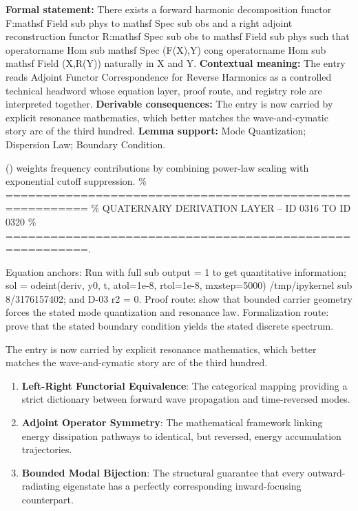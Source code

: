 \begingroup\footnotesize\setlength{\emergencystretch}{3em}\sloppy
\textbf{Formal statement:} There exists a forward harmonic decomposition functor F:mathsf Field sub phys to mathsf Spec sub obs and a right adjoint reconstruction functor R:mathsf Spec sub obs to mathsf Field sub phys such that operatorname Hom sub mathsf Spec (F(X),Y) cong operatorname Hom sub mathsf Field (X,R(Y)) naturally in X and Y. \textbf{Contextual meaning:} The entry reads Adjoint Functor Correspondence for Reverse Harmonics as a controlled technical headword whose equation layer, proof route, and registry role are interpreted together. \textbf{Derivable consequences:} The entry is now carried by explicit resonance mathematics, which better matches the wave-and-cymatic story arc of the third hundred. \textbf{Lemma support:} Mode Quantization; Dispersion Law; Boundary Condition.\par
\endgroup

() weights frequency contributions by combining power-law scaling with exponential cutoff suppression. \% ========================================================= \% QUATERNARY DERIVATION LAYER -- ID 0316 TO ID 0320 \% =========================================================.

Equation anchors: Run with full sub output = 1 to get quantitative information; sol = odeint(deriv, y0, t, atol=1e-8, rtol=1e-8, mxstep=5000) /tmp/ipykernel sub 8/3176157402; and D-03 r2 = 0. Proof route: show that bounded carrier geometry forces the stated mode quantization and resonance law. Formalization route: prove that the stated boundary condition yields the stated discrete spectrum.

The entry is now carried by explicit resonance mathematics, which better matches the wave-and-cymatic story arc of the third hundred.
\endgroup

\begin{enumerate}[leftmargin=1.6em,itemsep=6pt,topsep=4pt]
\item \textbf{Left-Right Functorial Equivalence}: The categorical mapping providing a strict dictionary between forward wave propagation and time-reversed modes.
\item \textbf{Adjoint Operator Symmetry}: The mathematical framework linking energy dissipation pathways to identical, but reversed, energy accumulation trajectories.
\item \textbf{Bounded Modal Bijection}: The structural guarantee that every outward-radiating eigenstate has a perfectly corresponding inward-focusing counterpart.
\end{enumerate}

